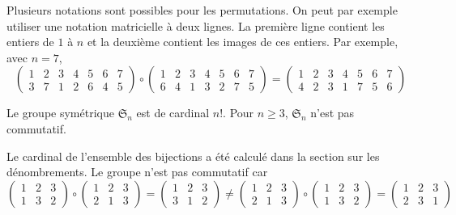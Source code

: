 Plusieurs notations sont possibles pour les permutations. On peut par exemple utiliser une notation matricielle à deux lignes. La première ligne contient les entiers de $1$ à $n$ et la deuxième contient les images de ces entiers. Par exemple, avec $n=7$,
\begin{displaymath}
 \begin{pmatrix}
  1 & 2 & 3 & 4 & 5 & 6 & 7 \\
  3 & 7 & 1 & 2 & 6 & 4 & 5
 \end{pmatrix}
\circ
 \begin{pmatrix}
  1 & 2 & 3 & 4 & 5 & 6 & 7 \\
  6 & 4 & 1 & 3 & 2 & 7 & 5
 \end{pmatrix}
=
 \begin{pmatrix}
  1 & 2 & 3 & 4 & 5 & 6 & 7 \\
  4 & 2 & 3 & 1 & 7 & 5 & 6
 \end{pmatrix}
\end{displaymath}
\begin{propn}
 Le groupe symétrique $\mathfrak{S}_n$ est de cardinal $n!$. Pour $n\geq3$, $\mathfrak{S}_n$ n'est pas commutatif.
\end{propn}
\begin{demo}
 Le cardinal de l'ensemble des bijections a été calculé dans la section sur les dénombrements. Le groupe n'est pas commutatif car 
\begin{displaymath}
 \begin{pmatrix}
  1 & 2 & 3 \\
  1 & 3 & 2
 \end{pmatrix}
\circ
 \begin{pmatrix}
  1 & 2 & 3 \\
  2 & 1 & 3
 \end{pmatrix}
 =
 \begin{pmatrix}
  1 & 2 & 3 \\
  3 & 1 & 2
 \end{pmatrix}
\neq
 \begin{pmatrix}
  1 & 2 & 3 \\
  2 & 1 & 3
 \end{pmatrix}
\circ
 \begin{pmatrix}
  1 & 2 & 3 \\
  1 & 3 & 2
 \end{pmatrix}
=
 \begin{pmatrix}
  1 & 2 & 3 \\
  2 & 3 & 1
 \end{pmatrix}
\end{displaymath}
\end{demo}
